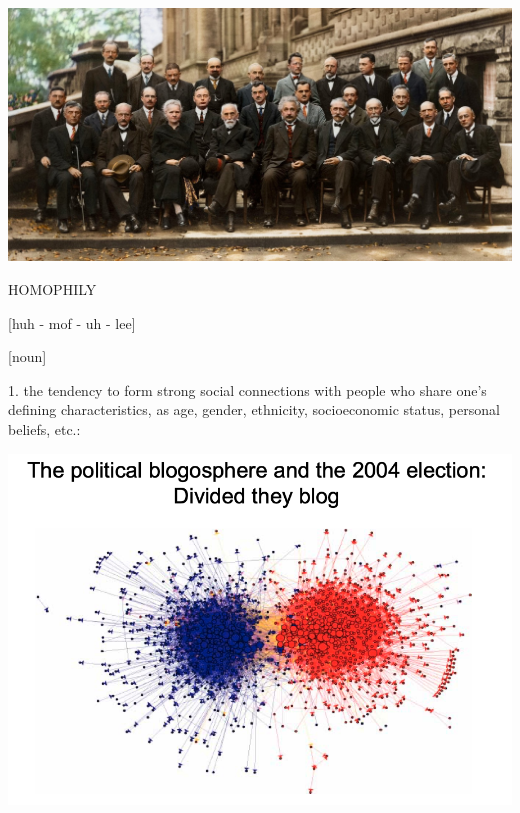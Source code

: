\documentclass{beamer}
\begin{document}
\begin{frame}
    \begin{center}
        \includegraphics[width=\textwidth]{static/stem.jpg}
    \end{center}
\end{frame}

\begin{frame}
    \begin{center}
    \begin{minipage}{.5\textwidth}
        \LARGE{HOMOPHILY}
    \end{minipage}
    \begin{minipage}{.3\textwidth}
        \normalsize{[huh - mof - uh - lee]}
    \end{minipage}
    \vspace{.5cm}

    \hspace{-8cm} \normalsize{[noun]}\\
    \end{center}
    \hspace{.8cm} \normalsize{1. the tendency to form strong social connections
    with people who share one’s defining characteristics, as age, gender, ethnicity, 
    socioeconomic status, personal beliefs, etc.:}
\end{frame}

\begin{frame}
    \begin{center}
        \includegraphics[width=\textwidth]{static/homophily.png}
    \end{center}
\end{frame}
\end{document}
